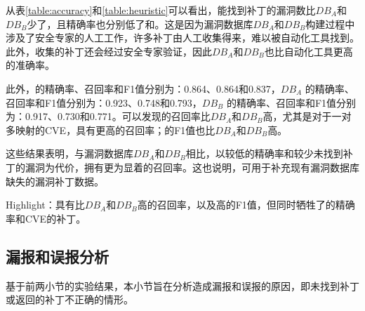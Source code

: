 从表\ref{table:accuracy}和\ref{table:heuristic}可以看出，\tool 能找到补丁的漏洞数比$DB_A$和$DB_B$少了，且精确率也分别低了和。这是因为漏洞数据库$DB_A$和$DB_B$构建过程中涉及了安全专家的人工工作，许多补丁由人工收集得来，难以被自动化工具找到。此外，收集的补丁还会经过安全专家验证，因此$DB_A$和$DB_B$也比自动化工具更高的准确率。

此外，\tool 的精确率、召回率和F1值分别为：0.864、0.864和0.837，$DB_A$ 的精确率、召回率和F1值分别为：0.923、0.748和0.793，$DB_B$ 的精确率、召回率和F1值分别为：0.917、0.730和0.771。可以发现\tool 的召回率比$DB_A$和$DB_B$高，尤其是对于一对多映射的CVE，\tool 具有更高的召回率；\tool 的F1值也比$DB_A$和$DB_B$高。

这些结果表明，与漏洞数据库$DB_A$和$DB_B$相比，\tool 以较低的精确率和较少未找到补丁的漏洞为代价，拥有更为显着的召回率。这也说明，\tool 可用于补充现有漏洞数据库缺失的漏洞补丁数据。

\begin{tcolorbox}[size=title,opacityfill=0.15]
Highlight：\tool 具有比$DB_A$和$DB_B$高的召回率，以及高的F1值，但同时\tool 牺牲了的精确率和CVE的补丁。
\end{tcolorbox}

\subsection{漏报和误报分析}\label{sec:fpfn}

基于前两小节的实验结果，本小节旨在分析造成\tool 漏报和误报的原因，即\tool 未找到补丁或返回的补丁不正确的情形。

